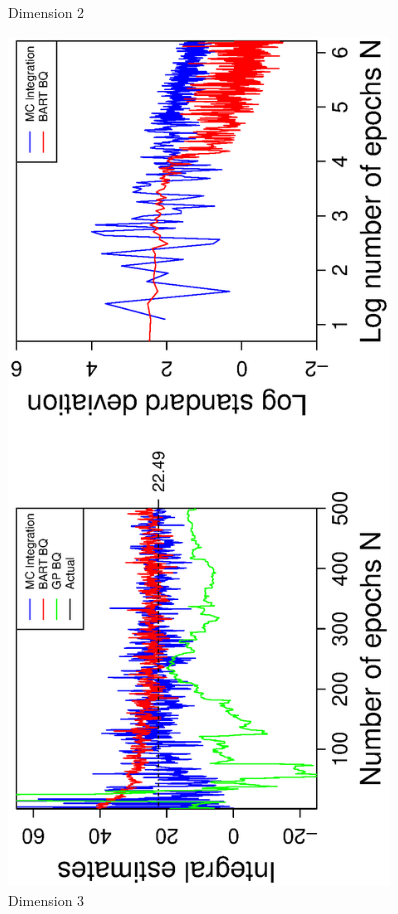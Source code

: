 \begin{figure}[H]
\begin{minipage}[b]{0.4\textwidth}
     \vspace{-1cm}
     \caption{Dimension 2}
  \end{minipage}
    \hspace{1.5cm}
  \begin{minipage}[b]{0.4\textwidth}
    \includegraphics[width= 0.9\textwidth, angle = -90]{report/Figures/3/convergenceMean33Dimensions.eps}
    \vspace{-1cm}
    \caption{Dimension 3}
  \end{minipage}
\end{figure}
\vspace{-1cm}

